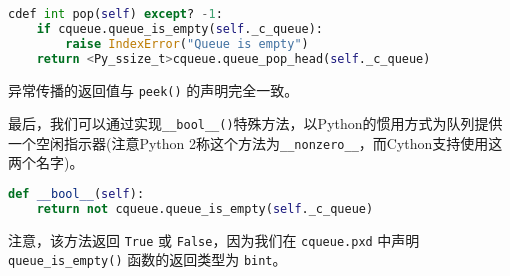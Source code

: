 \begin{translation}
\begin{framed}
\begin{lstlisting}[language=python]
cdef int pop(self) except? -1:
    if cqueue.queue_is_empty(self._c_queue):
        raise IndexError("Queue is empty")
    return <Py_ssize_t>cqueue.queue_pop_head(self._c_queue)
\end{lstlisting}异常传播的返回值与 \lstinline{peek()} 的声明完全一致。
\end{framed}

最后，我们可以通过实现\lstinline{__bool__()}特殊方法，以Python的惯用方式为队列提供一个空闲指示器(注意Python 2称这个方法为\lstinline{__nonzero__}，而Cython支持使用这两个名字)。

\begin{framed}
\begin{lstlisting}[language=python]
def __bool__(self):
    return not cqueue.queue_is_empty(self._c_queue)
\end{lstlisting}
\end{framed}

注意，该方法返回 \lstinline{True} 或 \lstinline{False}，因为我们在 \lstinline{cqueue.pxd} 中声明 \lstinline{queue_is_empty()} 函数的返回类型为 \lstinline{bint}。

\appendix


% 
% 

\begin{translation-index}
  \nocite{usingc}
  
  
\end{translation-index}

\end{translation}
